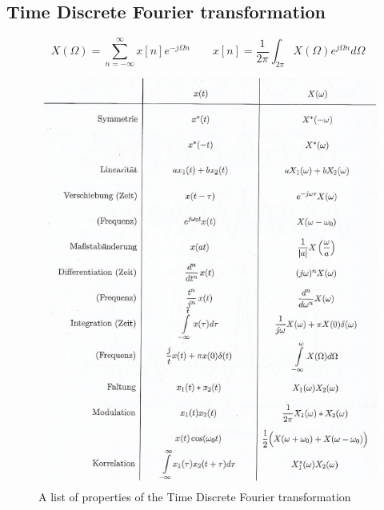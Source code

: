 \documentclass[10pt,a4paper]{article}
\begin{document}
\subsection{Time Discrete Fourier transformation}
$$
X(\Omega) = \sum_{n=-\infty}^{\infty} x[n] e^{-j \Omega n} \qquad
x[n] = \frac{1}{2\pi} \int_{2\pi} X(\Omega)e^{j \Omega n} d\Omega
$$
\begin{figure}[H]
\centering
\includegraphics[scale=1]{FourierContProperties.PNG}
\caption{A list of properties of the Time Discrete Fourier transformation}
\label{FourierContProperties}
\end{figure}
\end{document}
